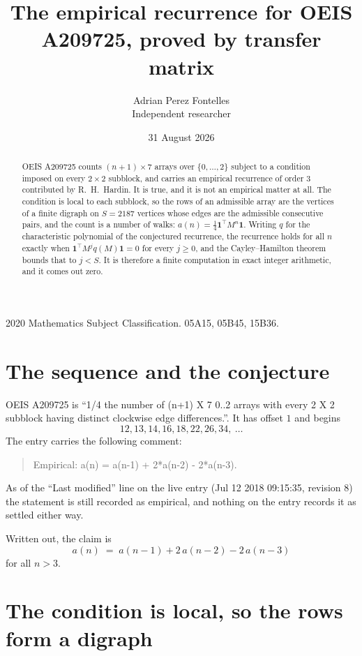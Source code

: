 \documentclass[11pt,a4paper]{article}
\title{The empirical recurrence for OEIS A209725, proved by transfer matrix}
\author{Adrian Perez Fontelles\\ \small Independent researcher}
\date{31 August 2026}
\theoremstyle{plain}
\theoremstyle{definition}
\begin{document}
\maketitle

\begin{abstract}
OEIS A209725 counts $(n+1)\times7$ arrays over $\{0,\dots,2\}$ subject to a condition imposed on
every $2\times2$ subblock, and carries an empirical recurrence of order $3$ contributed
by R.~H.~Hardin. It is true, and it is not an empirical matter at all. The condition is local
to each subblock, so the rows of an admissible array are the vertices of a finite digraph
on $S=2187$ vertices whose edges are the admissible consecutive pairs, and the count is a
number of walks: $a(n)=\tfrac1{4}\mathbf{1}^{\!\top}M^{n}\mathbf{1}$. Writing $q$
for the characteristic polynomial of the conjectured recurrence, the recurrence holds for all
$n$ exactly when $\mathbf{1}^{\!\top}M^{j}q(M)\mathbf{1}=0$ for every $j\ge0$, and the
Cayley--Hamilton theorem bounds that to $j<S$. It is therefore a finite computation in exact
integer arithmetic, and it comes out zero.
\end{abstract}

\noindent\small 2020 Mathematics Subject Classification. 05A15, 05B45, 15B36.\normalsize

\section{The sequence and the conjecture}

OEIS A209725 is ``1/4 the number of (n+1) X 7 0..2 arrays with every 2 X 2 subblock having distinct clockwise edge differences.''. It has offset $1$ and begins
\[
12, 13, 14, 16, 18, 22, 26, 34,\ \dots
\]
The entry carries the following comment:
\begin{quote}\small
Empirical: a(n) = a(n-1) + 2*a(n-2) - 2*a(n-3).
\end{quote}
As of the ``Last modified'' line on the live entry (Jul 12 2018 09:15:35, revision 8) the statement is
still recorded as empirical, and nothing on the entry records it as settled either way.

Written out, the claim is
\begin{equation}\label{eq:conj}
a(n)\;=\;a(n-1) + 2\,a(n-2) - 2\,a(n-3)
\end{equation}
for all $n>3$.

\section{The condition is local, so the rows form a digraph}
\end{document}
